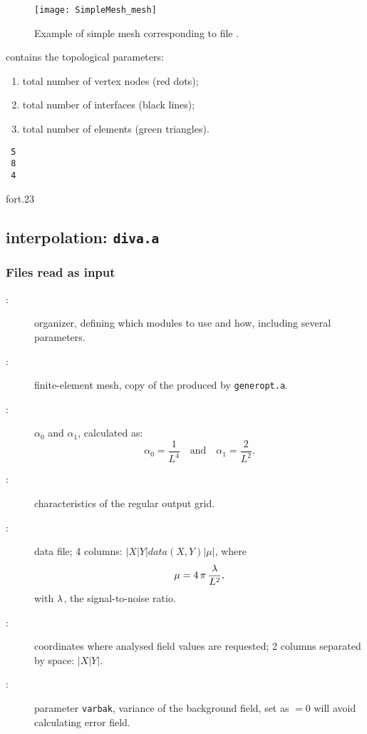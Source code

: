 \begin{description}

\begin{figure}[H]
\centering
\texttt{[image: SimpleMesh\_mesh]}
\caption[Example of simple mesh]{Example of simple mesh corresponding to file .}
\end{figure}


\item[\file{fort.23}:] contains the topological parameters: 
\begin{enumerate}
\item total number of vertex nodes (red dots);
\item total number of interfaces (black lines);  
\item total number of elements (green triangles).
\end{enumerate}

\begin{exfile}[H]
\begin{verbatim}
 5
 8
 4
 \end{verbatim}
\caption{fort.23\label{fig:fort23}}
\end{exfile}
 
\end{description}

\subsection{\diva interpolation: \texttt{diva.a}}

\subsubsection{Files read as input}
				
\begin{description}
\item[:]			 organizer, defining which modules to use and how, including several parameters.	
\item[:]			finite-element mesh, copy of the  produced by \texttt{generopt.a}.					
\item[:]			$\alpha_0$ and $\alpha_1$, calculated as: 
	 	\[\alpha_0=\frac{1}{L^{4}}\quad \textrm{and}  \quad  \alpha_1 =\frac{2}{L^{2}}.	\]				
\item[:]			characteristics of the regular output grid.					
\item[:]			data file; 4 columns: $|X|Y|data(X,Y)|\mu|$, where  
		\[ \mu = 4\,\pi\,\frac{\lambda}{L^{2}},\]
	  with $\lambda$, the signal-to-noise ratio.				
\item[:]			coordinates where analysed field values are requested; 2 columns separated by space: $|X|Y|$. 					
\item[:]			parameter \texttt{varbak}, variance of the background field, set as $=0$ will avoid calculating error field.						
\end{description}								
	 
